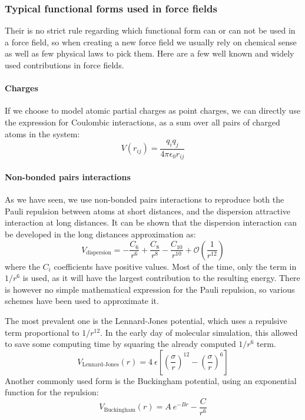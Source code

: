 \documentclass[thesis]{subfiles}
\begin{document}
\subsubsection{Typical functional forms used in force fields}

Their is no strict rule regarding which functional form can or can not be used
in a force field, so when creating a new force field we usually rely on
chemical sense as well as few physical laws to pick them. Here are a few well
known and widely used contributions in force fields.

\paragraph{Charges} If we choose to model atomic partial charges as point
charges, we can directly use the expression for Coulombic interactions, as a sum
over all pairs of charged atoms in the system:
\[ V(r_{ij}) = \frac{q_i q_j}{4 \pi \epsilon_0 r_{ij}}\]

\paragraph{Non-bonded pairs interactions} As we have seen, we use non-bonded
pairs interactions to reproduce both the Pauli repulsion between atoms at short
distances, and the dispersion attractive interaction at long distances. It can
be shown\cite{London1930} that the dispersion interaction can be developed in
the long distances approximation as:
\[ V_\text{dispersion} = -\frac{C_6}{r^6} + \frac{C_8}{r^8} - \frac{C_{10}}{r^{10}} + {\scriptstyle\mathcal{O}}\left(\frac{1}{r^{12}}\right) \]
where the $C_i$ coefficients have positive values. Most of the time, only the
term in $1/r^6$ is used, as it will have the largest contribution to the
resulting energy. There is however no simple mathematical expression for the
Pauli repulsion, so various schemes have been used to approximate it.

The most prevalent one is the Lennard-Jones potential, which uses a repulsive
term proportional to $1/r^{12}$. In the early day of molecular simulation, this
allowed to save some computing time by squaring the already computed $1/r^6$ term.
\[V_\text{Lennard-Jones}(r) = 4 \ \epsilon \left[\left(\frac{\sigma}{r}\right)^{12} - \left(\frac{\sigma}{r}\right)^6\right]\]
Another commonly used form is the Buckingham potential, using an exponential
function for the repulsion:
\[V_\text{Buckingham}(r) = A \ e^{-B r} - \frac{C}{r^6}\]
\end{document}
